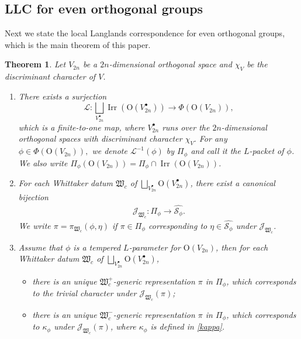 \documentclass[article]{article}
\numberwithin{equation}{section}
\newtheorem{theorem}{Theorem}[section]
\theoremstyle{definition}
\DeclareMathOperator{\Irr}{Irr}
\begin{document}
\subsection{LLC for even orthogonal groups}\label{LLCeven}
Next we state the local Langlands correspondence for even orthogonal groups, which is the main theorem of this paper.  

\begin{theorem}\label{desideratumall}
	Let $V_{2n}$ be a $2n$-dimensional orthogonal space and $\chi_V$ be the discriminant character of $V$.
	\begin{enumerate}[(1).]
		\item There exists a surjection
		$$
		\mathcal L: \bigsqcup_{V_{2n}^{\bullet}} \Irr \left(\mathrm O(V_{2n}^\bullet)\right) \longrightarrow \Phi(\mathrm O(V_{2n})),$$
		which is a finite-to-one map, where $V_{2n}^{\bullet}$ runs over the $2n$-dimensional orthogonal spaces with discriminant character $\chi_V.$ For any $\phi \in \Phi(\mathrm O(V_{2n})),$ we denote $\mathcal L^{-1}(\phi)$ by $\Pi_{\phi}$ and call it the $L$-packet of $\phi$. We also write $\Pi_{\phi}(\mathrm O(V_{2n}))=\Pi_{\phi}\cap \Irr(\mathrm O(V_{2n}))$. 
		\item For each Whittaker datum $\mathfrak W_{c}$ of $\bigsqcup_{V_{2n}^{\bullet}}\mathrm O(V_{2n}^{\bullet})$, there exist a canonical bijection
		\begin{align}\label{51}
		\mathcal J_{\mathfrak W_{c}} : \Pi_{\phi} \longrightarrow \widehat {\mathcal {S}_{\phi}}. 
		\end{align}
		We write $\pi=\pi_{\mathfrak W_{c}}(\phi,\eta)$ if $\pi\in  \Pi_{\phi}$ corresponding to $\eta \in \widehat{\mathcal {S}_{\phi}}$ under $\mathcal J_{\mathfrak W_{c}}$.
		\item Assume that $\phi$ is a tempered $L$-parameter for $\mathrm O(V_{2n})$, then for each Whittaker datum $\mathfrak W_{c}$ of $\bigsqcup_{V_{2n}^{\bullet}}\mathrm O(V_{2n}^{\bullet})$, 
		\begin{itemize}
			\item there is an unique $\mathfrak W^+_{c}$-generic representation $\pi$ in $\Pi_{\phi}$, which corresponds to  the trivial character under $\mathcal J_{\mathfrak W_{c}}(\pi)$; 
			\item there is an unique $\mathfrak W^{-}_{c}$-generic representation $\pi$ in $\Pi_{\phi}$, which corresponds to  $\kappa_{\phi}$ under $\mathcal J_{\mathfrak W_{c}}(\pi)$, where $\kappa_{\phi}$ is defined in \ref{kappa}. 
		\end{itemize}

\end{enumerate}
\end{theorem}
\end{document}
